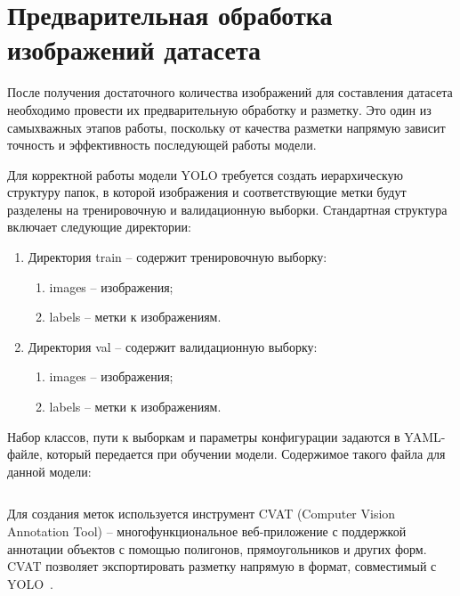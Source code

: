 \section{Предварительная обработка изображений датасета}

После получения достаточного количества изображений для составления датасета необходимо провести их предварительную обработку и разметку. Это один из самыхважных этапов работы, поскольку от качества разметки напрямую зависит точность и эффективность последующей работы модели.

Для корректной работы модели YOLO требуется создать иерархическую структуру папок, в которой изображения и соответствующие метки будут разделены на тренировочную и валидационную выборки. Стандартная структура включает следующие директории:

\begin{enumerate}
    \item Директория train -- содержит тренировочную выборку:
    \begin{enumerate}
        \item images -- изображения;
        \item labels -- метки к изображениям.
    \end{enumerate}
    \item Директория val -- содержит валидационную выборку:
    \begin{enumerate}
        \item images -- изображения;
        \item labels -- метки к изображениям.
    \end{enumerate}
\end{enumerate}

Набор классов, пути к выборкам и параметры конфигурации задаются в YAML-файле, который передается при обучении модели. Содержимое такого файла для данной модели:

\begin{code}
\vspace{-0.5cm}
{\small
\inputminted[mathescape,linenos,frame=lines,breaklines]{yaml}{code/train_captcha.yaml}
}
\end{code}
\vspace{-0.4cm}

Для создания меток используется инструмент CVAT (Computer Vision Annotation Tool) -- многофункциональное веб-приложение с поддержкой аннотации объектов с помощью полигонов, прямоугольников и других форм. CVAT позволяет экспортировать разметку напрямую в формат, совместимый с YOLO~\cite{CVAT}.

